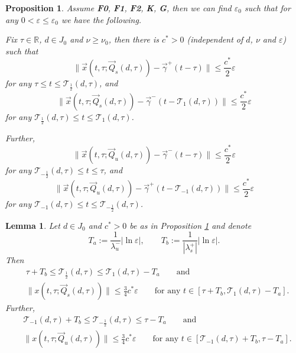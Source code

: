 \documentclass[10pt]{article}
\newtheorem{knownproposition}[knowntheorem]{Proposition}
\newtheorem{knownlemma}[knowntheorem]{Lemma}
\numberwithin{equation}{section}
\def\ga{\vec{\gamma}}
\def\ep{\varepsilon}
\def\la{\lambda}
\def\R{{\mathbb R}}
\def\TTT{\mathscr{T}}
\def\Q{\vec{Q}}
\def\x{\vec{x}}
\newcommand\assump[1]{{\rm\textbf{#1}}}
\theoremstyle{definition}
\theoremstyle{remark}
\begin{document}
 \begin{knownproposition}\label{forPropC}\cite[Proposition 4.7]{CFPrestate} %
  Assume \assump{F0}, \assump{F1}, \assump{F2}, \assump{K}, \assump{G}, then we can find $\ep_0$ such that for
  any $0< \ep \le \ep_0$ we have the following.

  Fix $\tau \in \R$, $d \in J_0$ and $\nu \ge \nu_0$, then there is $c^*>0$
  (independent of $d$, $\nu$ and $\ep$) such that
  $$
  \| \x(t,\tau; \Q_s(d,\tau))-\ga^+(t-\tau)\| \le \frac{c^*}{2} \ep $$
  for any $\tau \le t \le \TTT_{\frac{1}{2}}(d,\tau)$, and
   $$
  \| \x(t,\tau; \Q_s(d,\tau))-\ga^-(t-\TTT_1(d,\tau))\| \le \frac{c^*}{2} \ep $$
  for any $\TTT_{\frac{1}{2}}(d,\tau) \le t \le \TTT_1(d,\tau)$.

  Further,
  $$
  \| \x(t,\tau; \Q_u(d,\tau))-\ga^-(t-\tau)\| \le \frac{c^*}{2} \ep $$
  for any $  \TTT_{-\frac{1}{2}}(d,\tau)\le t \le \tau$, and
   $$
  \| \x(t,\tau; \Q_u(d,\tau))-\ga^+(t-\TTT_{-1}(d,\tau))\| \le \frac{c^*}{2} \ep $$
  for any $\TTT_{-1}(d,\tau) \le t \le \TTT_{-\frac{1}{2}}(d,\tau)$.
\end{knownproposition}


\begin{knownlemma}\label{forgottentimes}\cite[Lemma 4.9]{CFPrestate} %
  Let  $d \in J_0$    and $c^*>0$ be as in Proposition \ref{forPropC} and denote
  \begin{equation}\label{TaTb}
  	T_a:=\frac{1}{\la_u^-}|\ln \ep|,\qquad T_b:=\frac{1}{|\la_s^+|}|\ln\ep|.
  \end{equation}
  Then
  \begin{equation}\label{T.half}
  \begin{split}
       & \tau +T_b  \le \TTT_{\frac{1}{2}}(d,\tau) \le \TTT_1(d,\tau)-T_a  \qquad  \textrm{and}   \\
       &  \|x(t,\tau ; \Q_s(d,\tau))\| \le  \frac{3}{4}  c^* \ep  \qquad  \textrm{for any $t \in [\tau +T_b ,\TTT_1(d,\tau)-T_a]$.}
  \end{split}
  \end{equation}
  Further,
   \begin{equation}\label{T.halfbis}
  \begin{split}
       & \TTT_{-1}(d,\tau) +T_b  \le \TTT_{-\frac{1}{2}}(d,\tau) \le \tau-T_a  \qquad  \textrm{and}   \\
       &  \|x(t,\tau ; \Q_u(d,\tau))\| \le   \frac{3}{4}  c^* \ep  \qquad  \textrm{for any $t \in [\TTT_{-1}(d,\tau) +T_b ,\tau-T_a]$.}
  \end{split}
  \end{equation}
\end{knownlemma}
\end{document}
